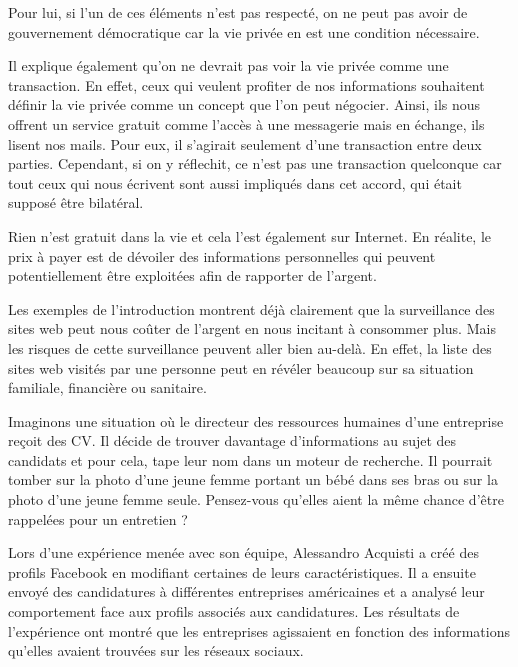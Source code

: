 Pour lui, si l'un de ces éléments n'est pas respecté, on ne peut pas avoir de gouvernement démocratique car la vie privée en est une condition nécessaire.
\newline

Il explique également qu'on ne devrait pas voir la vie privée comme une transaction. En effet, ceux qui veulent profiter de nos informations souhaitent définir la vie privée comme un concept que l'on peut négocier. Ainsi, ils nous offrent un service gratuit comme l'accès à une messagerie mais en échange, ils lisent nos mails. Pour eux, il s'agirait seulement d'une transaction entre deux parties. Cependant, si on y réflechit, ce n'est pas une transaction quelconque car tout ceux qui nous écrivent sont aussi impliqués dans cet accord, qui était supposé être bilatéral.

Rien n'est gratuit dans la vie et cela l'est également sur Internet. En réalite, le prix à payer est de dévoiler des informations personnelles qui peuvent potentiellement être exploitées afin de rapporter de l'argent.
\newline

Les exemples de l'introduction montrent déjà clairement que la surveillance des sites web peut nous coûter de l'argent en nous incitant à consommer plus. Mais les risques de cette surveillance peuvent aller bien au-delà. En effet, la liste des sites web visités par une personne peut en révéler beaucoup sur sa situation familiale, financière ou sanitaire.
\newline

Imaginons une situation où le directeur des ressources humaines d'une entreprise reçoit des CV. Il décide de trouver davantage d'informations au sujet des candidats et pour cela, tape leur nom dans un moteur de recherche. Il pourrait tomber sur la photo d'une jeune femme portant un bébé dans ses bras ou sur la photo d'une jeune femme seule. Pensez-vous qu'elles aient la même chance d'être rappelées pour un entretien ?

Lors d'une expérience menée avec son équipe, Alessandro Acquisti a créé des profils Facebook en modifiant certaines de leurs caractéristiques. Il a ensuite envoyé des candidatures à différentes entreprises américaines et a analysé leur comportement face aux profils associés aux candidatures. Les résultats de l'expérience ont montré que les entreprises agissaient en fonction des informations qu'elles avaient trouvées sur les réseaux sociaux.
\newline


